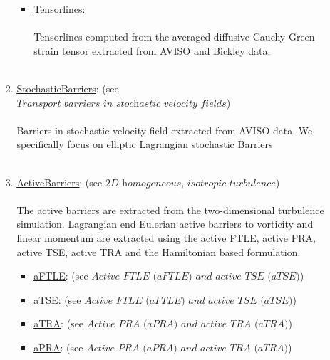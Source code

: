 \documentclass{article}
\begin{document}
\begin{enumerate}
\begin{enumerate}
\begin{enumerate}
\begin{itemize}
\item \href{https://github.com/EncinasBartos/TBarrier/tree/main/TBarrier/2D/demos/DiffusionBarriers/Tensorlines}{\underline{Tensorlines}}: \\ \\
Tensorlines computed from the averaged diffusive Cauchy Green strain tensor extracted from AVISO and Bickley data.\\ \\
\end{itemize}
\item \href{https://github.com/EncinasBartos/TBarrier/tree/main/TBarrier/2D/demos/StochasticBarriers}{\underline{StochasticBarriers}}: (see $ \textit{Transport barriers in stochastic velocity fields} $)\\ \\
Barriers in stochastic velocity field extracted from AVISO data. We specifically focus on elliptic Lagrangian stochastic Barriers \\ \\
\item \href{https://github.com/EncinasBartos/TBarrier/tree/main/TBarrier/2D/demos/ActiveBarriers}{\underline{ActiveBarriers}}: (see $ \textit{2D homogeneous, isotropic turbulence} $)\\ \\
The active barriers are extracted from the two-dimensional turbulence simulation. Lagrangian end Eulerian active barriers to vorticity and linear momentum are extracted using the active FTLE, active PRA, active TSE, active TRA and the Hamiltonian based formulation. \\
\begin{itemize}
\item \href{https://github.com/EncinasBartos/TBarrier/tree/main/TBarrier/2D/demos/ActiveBarriers/aFTLE}{\underline{aFTLE}}: (see $ \textit{Active FTLE (aFTLE) and active TSE (aTSE)} $) \\
\item \href{https://github.com/EncinasBartos/TBarrier/tree/main/TBarrier/2D/demos/ActiveBarriers/aTSE}{\underline{aTSE}}: (see $ \textit{Active FTLE (aFTLE) and active TSE (aTSE)} $) \\
\item \href{https://github.com/EncinasBartos/TBarrier/tree/main/TBarrier/2D/demos/ActiveBarriers/aTRA}{\underline{aTRA}}: (see $ \textit{Active PRA (aPRA) and active TRA (aTRA)} $) \\
\item \href{https://github.com/EncinasBartos/TBarrier/tree/main/TBarrier/2D/demos/ActiveBarriers/aPRA}{\underline{aPRA}}: (see $ \textit{Active PRA (aPRA) and active TRA (aTRA)} $) \\

\end{itemize}
\end{enumerate}
\end{enumerate}
\end{enumerate}
\end{document}
